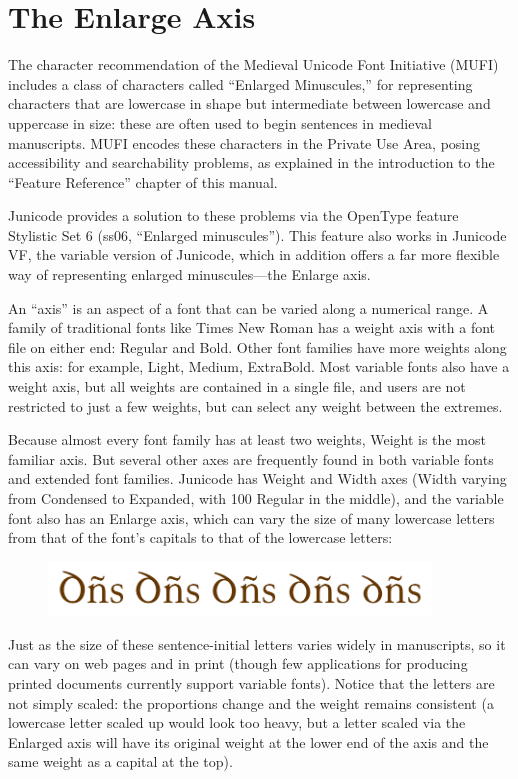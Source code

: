 \chapter{The Enlarge Axis}\hypertarget{enlarge}{}

The character recommendation of the Medieval Unicode Font Initiative (MUFI) includes a class of characters called
“Enlarged Minuscules,” for representing characters that are lowercase in shape but intermediate between lowercase 
and uppercase in size: these are often used to begin sentences in medieval manuscripts. MUFI encodes these characters 
in the Private Use Area, posing accessibility and searchability problems, as explained in the introduction to the 
“Feature Reference” chapter of this manual.

Junicode provides a solution to these problems via the OpenType feature Stylistic Set 6 (ss06, “Enlarged minuscules”). 
This feature also works in Junicode VF, the variable version of Junicode, which in addition offers a far more flexible 
way of representing enlarged minuscules—the Enlarge axis.

An “axis” is an aspect of a font that can be varied along a numerical range. A family of traditional fonts like Times 
New Roman has a weight axis with a font file on either end: Regular and Bold. Other font families have more weights 
along this axis: for example, Light, Medium, ExtraBold. Most variable fonts also have a weight axis, but all weights 
are contained in a single file, and users are not restricted to just a few weights, but can select any weight between 
the extremes.

Because almost every font family has at least two weights, Weight is the most familiar axis. But several other axes are 
frequently found in both variable fonts and extended font families. Junicode has Weight and Width axes (Width varying 
from { Condensed} to { Expanded}, with 100 Regular in the middle), and the variable font also has 
an Enlarge axis, which can vary the size of many lowercase letters from that of the font's capitals to that of the 
lowercase letters:
\begin{figure}[h!]
  \centering\includegraphics[width=4in]{dns.png}
\end{figure}
Just as the size of these sentence-initial letters varies widely in manuscripts, so it can vary on web pages and in 
print (though few applications for producing printed documents currently support variable fonts). Notice that the letters 
are not simply scaled: the proportions change and the weight remains consistent (a lowercase letter scaled up would look 
too heavy, but a letter scaled via the Enlarged axis will have its original weight at the lower end of the axis and the 
same weight as a capital at the top).

